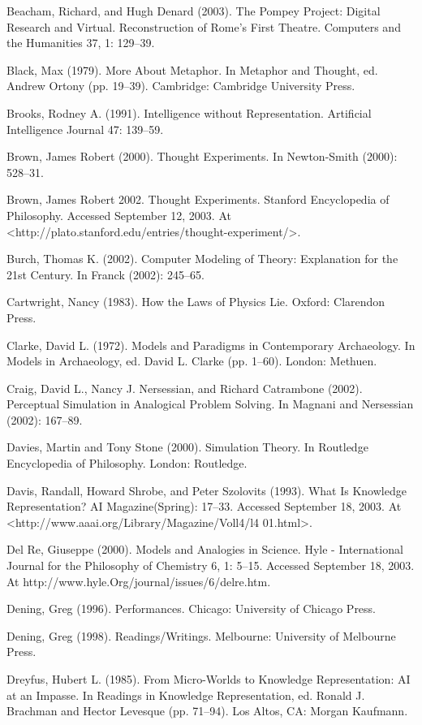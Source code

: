 Beacham, Richard, and Hugh Denard (2003). The Pompey Project: Digital Research and Virtual. Reconstruction of Rome's First Theatre. Computers and the Humanities 37, 1: 129–39.

Black, Max (1979). More About Metaphor. In Metaphor and Thought, ed. Andrew Ortony (pp. 19–39). Cambridge: Cambridge University Press.

Brooks, Rodney A. (1991). Intelligence without Representation. Artificial Intelligence Journal 47: 139–59.

Brown, James Robert (2000). Thought Experiments. In Newton-Smith (2000): 528–31.

Brown, James Robert 2002. Thought Experiments. Stanford Encyclopedia of Philosophy. Accessed September 12, 2003. At <http://plato.stanford.edu/entries/thought-experiment/>.

Burch, Thomas K. (2002). Computer Modeling of Theory: Explanation for the 21st Century. In Franck (2002): 245–65.

Cartwright, Nancy (1983). How the Laws of Physics Lie. Oxford: Clarendon Press.

Clarke, David L. (1972). Models and Paradigms in Contemporary Archaeology. In Models in Archaeology, ed. David L. Clarke (pp. 1–60). London: Methuen.

Craig, David L., Nancy J. Nersessian, and Richard Catrambone (2002). Perceptual Simulation in Analogical Problem Solving. In Magnani and Nersessian (2002): 167–89.

Davies, Martin and Tony Stone (2000). Simulation Theory. In Routledge Encyclopedia of Philosophy. London: Routledge.

Davis, Randall, Howard Shrobe, and Peter Szolovits (1993). What Is Knowledge Representation? AI Magazine(Spring): 17–33. Accessed September 18, 2003. At <http://www.aaai.org/Library/Magazine/Voll4/l4 01.html>.

Del Re, Giuseppe (2000). Models and Analogies in Science. Hyle - International Journal for the Philosophy of Chemistry 6, 1: 5–15. Accessed September 18, 2003. At http://www.hyle.Org/journal/issues/6/delre.htm.

Dening, Greg (1996). Performances. Chicago: University of Chicago Press.

Dening, Greg (1998). Readings/Writings. Melbourne: University of Melbourne Press.

Dreyfus, Hubert L. (1985). From Micro-Worlds to Knowledge Representation: AI at an Impasse. In Readings in Knowledge Representation, ed. Ronald J. Brachman and Hector Levesque (pp. 71–94). Los Altos, CA: Morgan Kaufmann.

